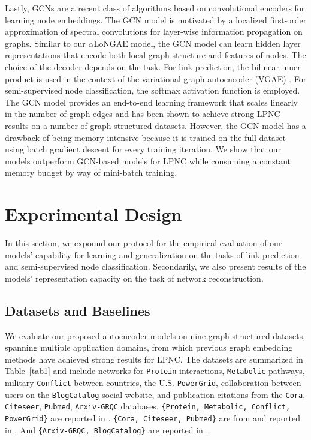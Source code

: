 \documentclass[letterpaper, conference]{IEEEtran}  %
\begin{document}
Lastly, GCNs \cite{Kipf:2016} are a recent class of algorithms based on convolutional encoders for learning node embeddings. The GCN model is motivated by a localized first-order approximation of spectral convolutions for layer-wise information propagation on graphs. Similar to our $\alpha$LoNGAE model, the GCN model can learn hidden layer representations that encode both local graph structure and features of nodes. The choice of the decoder depends on the task. For link prediction, the bilinear inner product is used in the context of the variational graph autoencoder (VGAE) \cite{VGAE:2016}. For semi-supervised node classification, the softmax activation function is employed. The GCN model provides an end-to-end learning framework that scales linearly in the number of graph edges and has been shown to achieve strong LPNC results on a number of graph-structured datasets. However, the GCN model has a drawback of being memory intensive because it is trained on the full dataset using batch gradient descent for every training iteration. We show that our models outperform GCN-based models for LPNC while consuming a constant memory budget by way of mini-batch training.

\section{Experimental Design}
In this section, we expound our protocol for the empirical evaluation of our models' capability for learning and generalization on the tasks of link prediction and semi-supervised node classification. Secondarily, we also present results of the models' representation capacity on the task of network reconstruction.

\subsection{Datasets and Baselines}
%
We evaluate our proposed autoencoder models on nine graph-structured datasets, spanning multiple application domains, from which previous graph embedding methods have achieved strong results for LPNC. The datasets are summarized in Table~\ref{tab1} and include networks for \texttt{Protein} interactions, \texttt{Metabolic} pathways, military \texttt{Conflict} between countries, the U.S. \texttt{PowerGrid}, collaboration between users on the \texttt{BlogCatalog} social website, and publication citations from the \texttt{Cora}, \texttt{Citeseer}, \texttt{Pubmed}, \texttt{Arxiv-GRQC} databases. \texttt{\{Protein, Metabolic, Conflict, PowerGrid\}} are reported in \cite{Menon:2011}. \texttt{\{Cora, Citeseer, Pubmed\}} are from \cite{Sen:2008} and reported in \cite{Kipf:2016,VGAE:2016}. And \texttt{\{Arxiv-GRQC, BlogCatalog\}} are reported in \cite{Wang:2016}.
\end{document}
